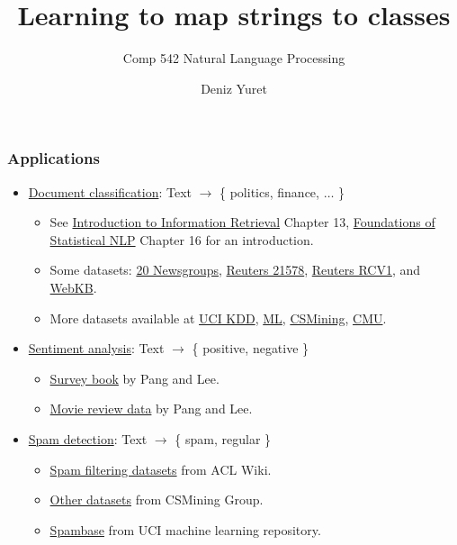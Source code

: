 \documentclass[ignorenonframetext,plain,fleqn]{beamer}
\title{Learning to map strings to classes}
\subtitle{Comp 542 Natural Language Processing}
\author{Deniz Yuret}
\begin{document}
\begin{frame}
\maketitle
\end{frame}

\begin{frame}\frametitle{Applications}
\begin{itemize}
\item
  \href{http://en.wikipedia.org/wiki/Document_classification}{Document
    classification}: Text $\rightarrow$ \{ politics, finance, $\dots$ \}
\begin{itemize}
\item See \href{http://www-nlp.stanford.edu/IR-book}{Introduction to
  Information Retrieval} Chapter 13,
  \href{http://nlp.stanford.edu/fsnlp}{Foundations of Statistical NLP}
  Chapter 16 for an introduction.
\item Some datasets: \href{http://qwone.com/~jason/20Newsgroups}{20 Newsgroups},
  \href{http://www.daviddlewis.com/resources/testcollections/reuters21578}{Reuters
    21578}, 
  \href{http://www.ai.mit.edu/projects/jmlr/papers/volume5/lewis04a/lyrl2004_rcv1v2_README.htm}{Reuters
    RCV1}, and \href{http://www.cs.cmu.edu/~webkb/}{WebKB}.
\item More datasets available at \href{http://kdd.ics.uci.edu}{UCI
  KDD}, \href{http://archive.ics.uci.edu/ml/index.html}{ML},
  \href{http://csmining.org/index.php/data.html}{CSMining},
  \href{http://www.cs.cmu.edu/~TextLearning/datasets.html}{CMU}.
\end{itemize}
\item \href{http://en.wikipedia.org/wiki/Sentiment_analysis}{Sentiment
  analysis}: Text $\rightarrow$ \{ positive, negative \}
\begin{itemize}
\item
  \href{http://www.cs.cornell.edu/home/llee/opinion-mining-sentiment-analysis-survey.html}{Survey
    book} by Pang and Lee.
\item
  \href{http://www.cs.cornell.edu/people/pabo/movie-review-data}{Movie
    review data} by Pang and Lee.
\end{itemize}
\item \href{http://en.wikipedia.org/wiki/Anti-spam_techniques}{Spam
  detection}: Text $\rightarrow$ \{ spam, regular \}
\begin{itemize}
\item
  \href{http://www.aclweb.org/aclwiki/index.php?title=Spam_filtering_datasets}{Spam
  filtering datasets} from ACL Wiki.
\item \href{http://csmining.org/index.php/data.html}{Other datasets} from
  CSMining Group.
\item \href{http://archive.ics.uci.edu/ml/datasets/Spambase}{Spambase}
  from UCI machine learning repository.
\end{itemize}
\end{itemize}
\end{frame}
\end{document}

